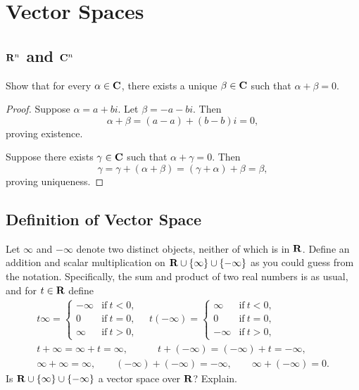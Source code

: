 \chapter{Vector Spaces}


\section{\texorpdfstring{$\mathbf{R}^{n}$}{R\^{}n} and \texorpdfstring{$\mathbf{C}^{n}$}{C\^{}n}}

\begin{exercise}{7}
	Show that for every \( \alpha \in \mathbf{C} \), there exists a unique \( \beta \in \mathbf{C} \)
	such that \( \alpha + \beta = 0 \).
\end{exercise}

\begin{proof}
	Suppose \( \alpha = a + bi \). Let \( \beta = -a - bi \). Then
	\[
		\alpha + \beta = (a - a) + (b - b)i = 0,
	\]
	proving existence.

	Suppose there exists \( \gamma \in \mathbf{C} \) such that \( \alpha + \gamma = 0 \). Then
	\[
		\gamma = \gamma + (\alpha + \beta) = (\gamma + \alpha) + \beta = \beta,
	\]
	proving uniqueness.
\end{proof}



\section{Definition of Vector Space}

\begin{exercise}{6}
	Let \( \infty \) and \( -\infty \) denote two distinct objects, neither of
	which is in \( \mathbf{R} \). Define an addition and scalar multiplication on
	\( \mathbf{R} \cup \{\infty\} \cup \{-\infty\} \) as you could guess from the notation.
	Specifically, the sum and product of two real numbers is as usual, and for
	\( t \in \mathbf{R} \) define
	\begin{gather*}
		t\infty = \begin{cases}
			-\infty & \text{if} \ t < 0, \\
			0       & \text{if} \ t = 0, \\
			\infty  & \text{if} \ t > 0,
		\end{cases} \quad
		t(-\infty) = \begin{cases}
			\infty  & \text{if} \ t < 0, \\
			0       & \text{if} \ t = 0, \\
			-\infty & \text{if} \ t > 0,
		\end{cases} \\
		t + \infty = \infty + t = \infty, \quad\quad\quad t + (-\infty) = (-\infty) + t = -\infty, \\
		\infty + \infty = \infty, \quad\quad (-\infty) + (-\infty) = -\infty, \quad\quad \infty + (-\infty) = 0.
	\end{gather*}
	Is \( \mathbf{R} \cup \{\infty\} \cup \{-\infty\} \) a vector space over \( \mathbf{R} \)? Explain.
\end{exercise}

